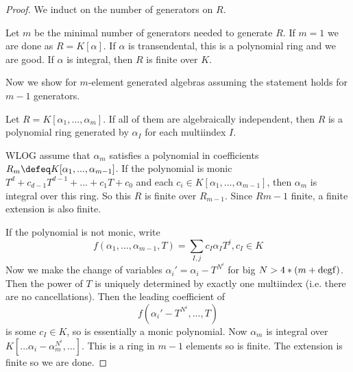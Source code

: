 \begin{proof}
    We induct on the number of generators on $R$.

    Let $m$ be the minimal number of generators needed to generate $R$. If $m=1$ we are done as $R=K[\alpha]$. If $\alpha$ is transendental, this is a polynomial ring and we are good. If $\alpha$ is integral, then $R$ is finite over $K$.

    Now we show for $m$-element generated algebras assuming the statement holds for $m-1$ generators.

    Let $R=K[\alpha_1,...,\alpha_m]$. If all of them are algebraically independent, then $R$ is a polynomial ring generated by $\alpha_I$ for each multiindex $I$.
    
    WLOG assume that $\alpha_m$ satisfies a polynomial in coefficients $R_m\defeq K[\alpha_1,...,\alpha_{m-1}]$. If the polynomial is monic $T^d+c_{d-1}T^{d-1}+...+c_1T+c_0$ and each $c_i\in K[\alpha_1,...,\alpha_{m-1}]$, then $\alpha_m$ is integral over this ring. So this $R$ is finite over $R_{m-1}$. Since $R{m-1}$ finite, a finite extension is also finite.

    If the polynomial is not monic, write \[
    f(\alpha_1,...,\alpha_{m-1},T)=\sum_{I,j} c_I \alpha_I T^j, c_I\in K
    \]
    Now we make the change of variables $\alpha_i'=\alpha_i-T^{N^i}$ for big $N>4*({m+\rm{deg}f})$. Then the power of $T$ is uniquely determined by exactly one multiindex (i.e. there are no cancellations).
    Then the leading coefficient of \[
    f(\alpha_i'-T^{N^i},...,T)
    \]
    is some $c_I\in K$, so is essentially a monic polynomial. Now $\alpha_m$ is integral over $K[...\alpha_i-\alpha_m^{N^i},...]$. This is a ring in $m-1$ elements so is finite. The extension is finite so we are done.
\end{proof}